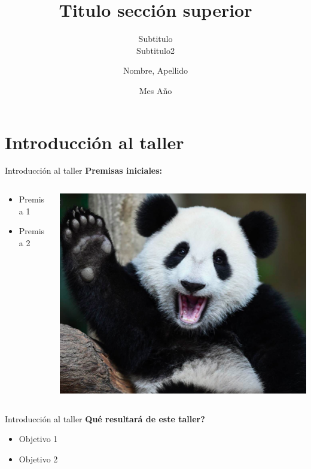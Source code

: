 \documentclass{bredelebeamer}
\title[Pie de diapositiva centro]{Titulo sección superior}
\subtitle{Subtitulo \\ Subtitulo2}
\author{Nombre, Apellido}
\institute[Pie de diapositiva izquierdo]
\date{Mes Año}
\begin{document}
\begin{frame}
  \titlepage 
\end{frame}



\section{Introducción al taller}

\begin{frame}{Introducción al taller}
\textbf{Premisas iniciales:}
\begin{columns}
\begin{column}{0.5\textwidth}
\begin{itemize}
\item Premisa 1
\item Premisa 2
\end{itemize}
\end{column}
\begin{column}{0.3\textwidth}
\includegraphics[scale=0.2]{images/panda.png}
\end{column}
\end{columns}
\end{frame}

\begin{frame}{Introducción al taller}
\textbf{Qué resultará de este taller?}\\
\begin{itemize}
\item Objetivo 1
\item Objetivo 2
\end{itemize}
\end{frame}
\end{document}
